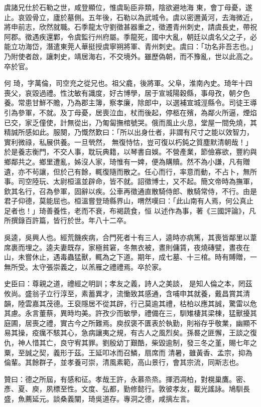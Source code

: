 \begin{pinyinscope}
 虞諸兄仕於石勒之世，咸登顯位，惟虞恥臣非類，陰欲避地海
 東，會丁母憂，遂止。哀毀骨立，廬於墓側。五年後，石勒以為武城令。虞以密邇黃河，去海微近，將申前志，欣然就職。石季龍太守劉徵甚器重之，徵遷青州刺史，請虞長史，帶祝阿郡。徵遇疾還鄴，令虞監行州府屬。季龍死，國中大亂，朝廷以虞名父之子，必能立功海岱，潛遣東莞人華挺授虞寧朔將軍、青州刺史。虞曰：「功名非吾志也。」乃附使者啟，讓刺史，靖居海右，不交境外。雖歷偽朝，而不豫亂，世以此高之。卒於官。



 何
 琦，字萬倫，司空充之從兄也。祖父龕，後將軍。父阜，淮南內史。琦年十四喪父，哀毀過禮。性沈敏有識度，好古博學，居于宣城陽穀縣，事母孜，朝夕色養。常患甘鮮不贍，乃為郡主簿，察孝廉，除郎中，以選補宣城涇縣令。司徒王導引為參軍，不就。及丁母憂，居喪泣血，杖而後起，停柩在殯，為鄰火所逼，煙焰已交，家乏僮使，計無從出，乃匍匐撫棺號哭。俄而風止火息，堂屋一間免燒，其精誠所感如此。服闋，乃慨然歎曰：「所以出身仕者，非謂有尺寸之能以效智力，實利微祿，私展供養。一旦煢然，
 無復恃怙，豈可復以朽鈍之質塵默清朝哉！」於是養志衡門，不交人事，耽玩典籍，以琴書自娛。不營產業，節儉寡欲，豐約與鄉鄰共之。鄉里遭亂，姊沒人家，琦惟有一婢，便為購贖。然不為小謙，凡有贈遺，亦不茍讓，但於己有餘，輒復隨而散之。任心而行，率意而動，不占卜，無所事。司空陸玩、太尉桓溫並辟命，皆不就。詔徵博士，又不起。簡文帝時為撫軍，欽其名行，召為參軍，固辭以疾。公車再徵通直散騎侍郎、散騎常侍，不行。由是君子仰德，莫能屈也。桓溫嘗登琦縣界山，喟然嘆曰：「此山南有人焉，何公真止足者也！」琦善養性，老而不衰，布褐蔬食，恒
 以述作為事，著《三國評論》，凡所撰錄百許篇，皆行於世。年八十二卒。



 吳逵，吳興人也。經荒饑疾病，合門死者十有三人，逵時亦病篤，其喪皆鄰里以葦席裹而埋之。逵夫妻既存，家極貧窘，冬無衣被，晝則傭賃，夜燒磚甓，晝夜在山，未嘗休止，遇毒蟲猛獸，輒為之下道。期年，成七墓、十三棺。時有賻贈，一無所受。太守張崇義之，以羔雁之禮禮焉。卒於家。



 史臣曰：尊親之道，禮經之明訓；孝友之義，詩人之美談，
 是知人倫之本，罔茲攸尚。盛翁子立行淳至，素蓄異才，流慟致其感通，含哺申其就養，戴昌賞其清韻，陸雲嘉其茂德。王裒隱居不從其辟，行己莫逾其禮，枯柏以應其誠，驚雷以危其慮。永言董蔡，異時均美。許孜少而敏學，禮備在三，馴雉棲其梁棟，猛獸擾其庭圃，居喪之禮，實古今之所難焉。庾叔褒不匱表於執勤，則裕存乎敬業，幽顯不易其操，疫癘不駭其心，急病讓夷之規，有古人之風烈矣。孫晷之匪懈，王談之復仇，神人惜其亡，良守宥其罪。劉殷幼丁艱酷，柴毀逾制，發三冬之堇，賜七年之粟，至誠之契，義形于茲。王延叩冰而召鱗，扇席而
 清暑，雖黃香、孟宗，抑為倫輩。其餘群子，並孝養可崇，清風素範，高山景行，會其宗流，同斯志也。



 贊曰：德之所屆，有感和征。孝哉王許，永慕烝烝。揮泗凋柏，對榥巢鷹。密、彥、夏、庾，夙標至性。文度、弘都，勤修懿行。敦彼孝友，載光謠詠。鳩馴長盛，魚薦延元。談桑義闡，琦吳道存。專洞之德，咸摛左言。



\end{pinyinscope}